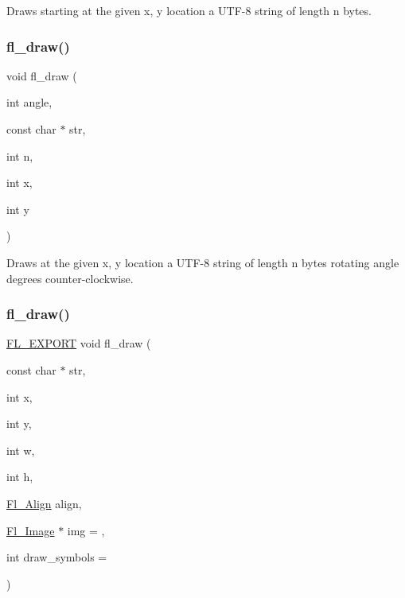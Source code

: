 Draws starting at the given {\ttfamily x}, {\ttfamily y} location a U\+T\+F-\/8 string of length {\ttfamily n} bytes. \mbox{\label{group__fl__drawings_ga14f28b302c1adf1f6dc76efbd6275a50}} 
\subsubsection{\texorpdfstring{fl\+\_\+draw()}{fl\_draw()}\hspace{0.1cm}{\footnotesize\ttfamily [4/6]}}
{\footnotesize\ttfamily void fl\+\_\+draw (\begin{DoxyParamCaption}\item[{int}]{angle,  }\item[{const char $\ast$}]{str,  }\item[{int}]{n,  }\item[{int}]{x,  }\item[{int}]{y }\end{DoxyParamCaption})\hspace{0.3cm}{\ttfamily [inline]}}

Draws at the given {\ttfamily x}, {\ttfamily y} location a U\+T\+F-\/8 string of length {\ttfamily n} bytes rotating {\ttfamily angle} degrees counter-\/clockwise. \mbox{\label{group__fl__drawings_ga0c1fe5be700c7b7079caf5dfd9fde9cd}} 
\subsubsection{\texorpdfstring{fl\+\_\+draw()}{fl\_draw()}\hspace{0.1cm}{\footnotesize\ttfamily [5/6]}}
{\footnotesize\ttfamily \hyperlink{_fl___export_8_h_aa9ba29a18aee9d738370a06eeb4470fc}{F\+L\+\_\+\+E\+X\+P\+O\+RT} void fl\+\_\+draw (\begin{DoxyParamCaption}\item[{const char $\ast$}]{str,  }\item[{int}]{x,  }\item[{int}]{y,  }\item[{int}]{w,  }\item[{int}]{h,  }\item[{\hyperlink{_enumerations_8_h_a44e8bcd1e030e65e4f88cbae64a7c3e3}{Fl\+\_\+\+Align}}]{align,  }\item[{\hyperlink{class_fl___image}{Fl\+\_\+\+Image} $\ast$}]{img = {},  }\item[{int}]{draw\+\_\+symbols = {} }\end{DoxyParamCaption})}


